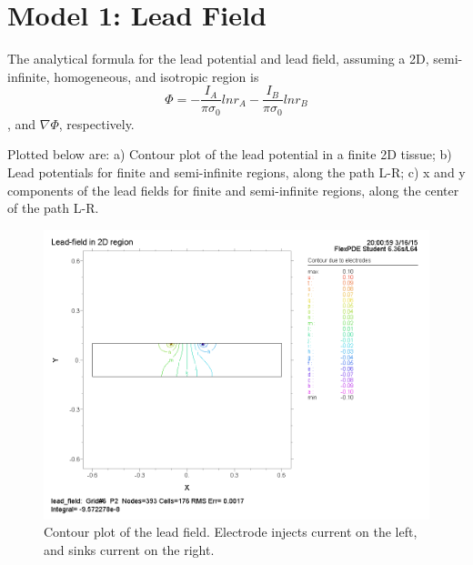 \documentclass{article}
\author{Allen Yin}
\begin{document}
\maketitle
\setlength\parskip{0.1in}

\section{Model 1: Lead Field}

The analytical formula for the lead potential and lead field, assuming a 2D, semi-infinite, homogeneous, and isotropic region is \[\Phi = -\frac{I_A}{\pi\sigma_0}ln{r_A}-\frac{I_B}{\pi\sigma_0}ln{r_B}\], and $\nabla{\Phi}$, respectively.

Plotted below are: a) Contour plot of the lead potential in a finite 2D tissue; b) Lead potentials for finite and semi-infinite regions, along the path L-R; c) x and y components of the lead fields for finite and semi-infinite regions, along the center of the path L-R.

\begin{figure}[H]
    \begin{center}
        \includegraphics[scale=0.5]{lead_field_contour.png}
        \caption{Contour plot of the lead field. Electrode injects current on the left, and sinks current on the right.}
    \end{center}
\end{figure}
\end{document}
